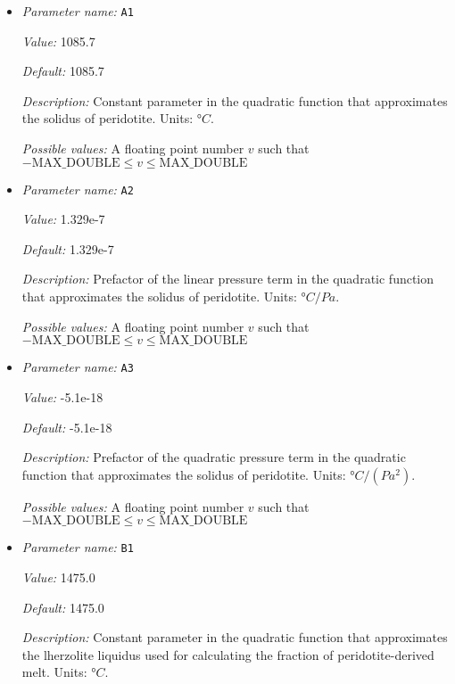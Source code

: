 \begin{itemize}
\item {\it Parameter name:} {\tt A1}
\label{parameters:Postprocess/Visualization/Melt fraction/A1}


{\it Value:} 1085.7


{\it Default:} 1085.7


{\it Description:} Constant parameter in the quadratic function that approximates the solidus of peridotite. Units: $°C$.


{\it Possible values:} A floating point number $v$ such that $-\text{MAX\_DOUBLE} \leq v \leq \text{MAX\_DOUBLE}$
\item {\it Parameter name:} {\tt A2}
\label{parameters:Postprocess/Visualization/Melt fraction/A2}


{\it Value:} 1.329e-7


{\it Default:} 1.329e-7


{\it Description:} Prefactor of the linear pressure term in the quadratic function that approximates the solidus of peridotite. Units: $°C/Pa$.


{\it Possible values:} A floating point number $v$ such that $-\text{MAX\_DOUBLE} \leq v \leq \text{MAX\_DOUBLE}$
\item {\it Parameter name:} {\tt A3}
\label{parameters:Postprocess/Visualization/Melt fraction/A3}


{\it Value:} -5.1e-18


{\it Default:} -5.1e-18


{\it Description:} Prefactor of the quadratic pressure term in the quadratic function that approximates the solidus of peridotite. Units: $°C/(Pa^2)$.


{\it Possible values:} A floating point number $v$ such that $-\text{MAX\_DOUBLE} \leq v \leq \text{MAX\_DOUBLE}$
\item {\it Parameter name:} {\tt B1}
\label{parameters:Postprocess/Visualization/Melt fraction/B1}


{\it Value:} 1475.0


{\it Default:} 1475.0


{\it Description:} Constant parameter in the quadratic function that approximates the lherzolite liquidus used for calculating the fraction of peridotite-derived melt. Units: $°C$.



\end{itemize}
